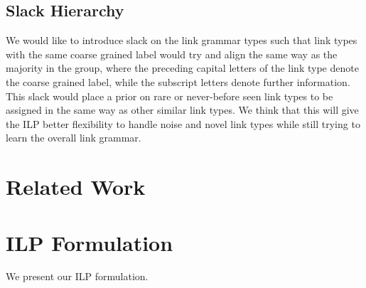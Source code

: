 \documentclass[11pt]{article}
\begin{document}
\subsection{Slack Hierarchy}
We would like to introduce slack on the link grammar types such that link types with the same coarse grained label would try and align the same way as the majority in the group, where the preceding capital letters of the link type denote the coarse grained label, while the subscript letters denote further information. This slack would place a prior on rare or never-before seen link types to be assigned in the same way as other similar link types. We think that this will give the ILP better flexibility to handle noise and novel link types while still trying to learn the overall link grammar.





\section{Related Work}










\clearpage
\appendix
\section{ILP Formulation}
We present our ILP formulation. 
\end{document}
